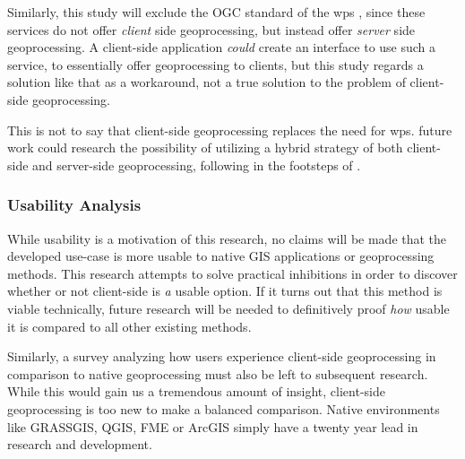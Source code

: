Similarly, this study will exclude the OGC standard of the \ac{wps} \cite{ogc_web_2015}, since these services do not offer \emph{client} side geoprocessing, but instead offer \emph{server} side geoprocessing. A client-side application \textit{could} create an interface to use such a service, to essentially offer geoprocessing to clients, but this study regards a solution like that as a workaround, not a true solution to the problem of client-side geoprocessing. 

This is not to say that client-side geoprocessing replaces the need for \ac{wps}. 
future work could research the possibility of utilizing a hybrid strategy of both client-side and server-side geoprocessing, following in the footsteps of \cite{panidi_hybrid_2015}. 



\subsubsection*{ Usability Analysis } %

While usability is a motivation of this research, no claims will be made that the developed use-case is more usable to native GIS applications or geoprocessing methods. This research attempts to solve practical inhibitions in order to discover whether or not client-side is \emph{a} usable option. If it turns out that this method is viable technically, future research will be needed to definitively proof \emph{how} usable it is compared to all other existing methods.  


Similarly, a survey analyzing how users experience client-side geoprocessing in comparison to native geoprocessing must also be left to subsequent research. While this would gain us a tremendous amount of insight, client-side geoprocessing is too new to make a balanced comparison. Native environments like GRASSGIS, QGIS, FME or ArcGIS simply have a twenty year lead in research and development. 



